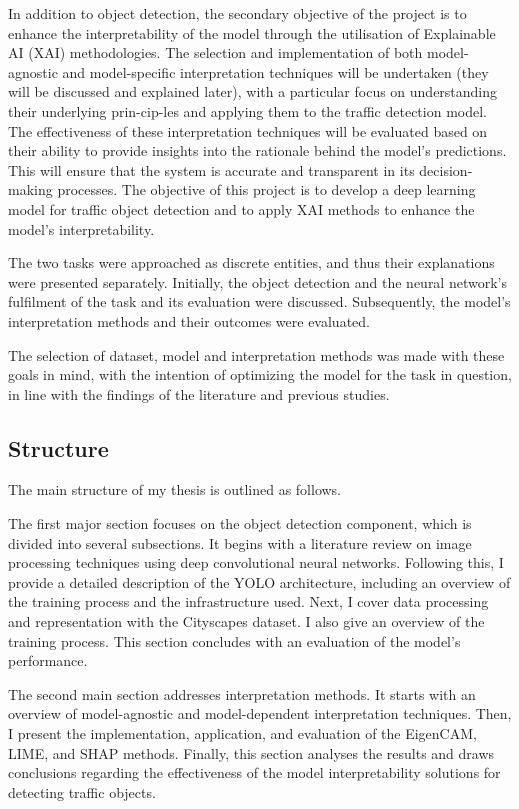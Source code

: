 In addition to object detection, the secondary objective of the project is to enhance the interpretability of the
model through the utilisation of Explainable AI (XAI) me\-tho\-do\-lo\-gies.
The selection and implementation of both model-agnostic and model-specific interpretation techniques will be undertaken (they will be discussed and explained later),
with a particular focus on understanding their underlying prin-cip-les and applying them to the traffic detection model.
The effectiveness of these interpretation techniques will be evaluated based on their
ability to provide insights into the rationale behind the model's predictions.
This will ensure that the system is accurate and transparent in its decision-making processes.
\newpage
The objective of this project is to develop a deep learning model for traffic object detection and to apply XAI methods to enhance the model's interpretability.

The two tasks were approached as discrete entities, and thus their explanations were presented separately.
Initially, the object detection and the neural network's fulfilment of the task and its evaluation were discussed.
Subsequently, the model's interpretation methods and their outcomes were evaluated.

The selection of dataset, model and interpretation methods was made with these goals in mind, with the intention of optimizing the model for the task in question, in line with the findings of the literature and previous studies.

\subsection{Structure}\label{subsec:Structure} %

The main structure of my thesis is outlined as follows.

The first major section focuses on the object detection component, which is divided into several subsections.
It begins with a literature review on image processing techniques using deep convolutional neural networks.
Following this, I provide a detailed description of the YOLO architecture, including an overview of the training process and the infrastructure used.
Next, I cover data processing and representation with the Cityscapes dataset. I also give an overview of the training process. This section concludes with an evaluation of the model’s performance.

The second main section addresses interpretation methods.
It starts with an overview of model-agnostic and model-dependent interpretation techniques.
Then, I present the implementation, application, and evaluation of the EigenCAM, LIME, and SHAP methods.
Finally, this section analyses the results and draws conclusions regarding the effectiveness of the model interpretability solutions for detecting traffic objects.

\newpage
